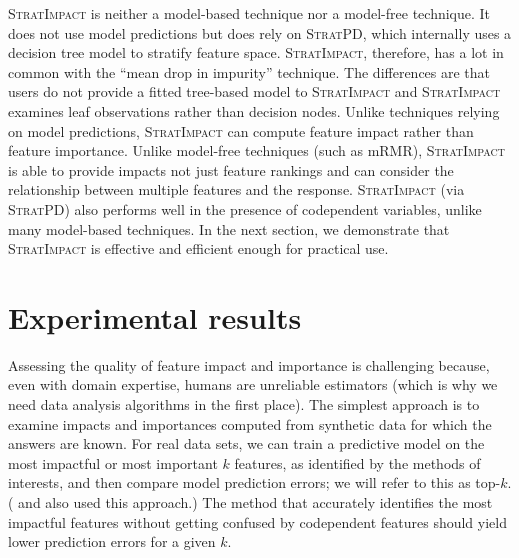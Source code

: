 \documentclass[smallextended]{svjour3}       %
\newcommand{\simp}{\fontfamily{cmr}\textsc{\small StratImpact}}
\newcommand{\spd}{\fontfamily{cmr}\textsc{\small StratPD}}
\begin{document}
\simp{} is neither a model-based technique nor a model-free technique. It does not use model predictions but does rely on \spd, which internally uses a decision tree model to stratify feature space. \simp{}, therefore, has a lot in common with the ``mean drop in impurity'' technique. The  differences are that users do not provide a fitted tree-based model to \simp{} and \simp{} examines leaf observations rather than decision nodes. Unlike techniques relying on model predictions, \simp{} can compute feature impact rather than feature importance. Unlike model-free techniques (such as mRMR), \simp{} is able to provide impacts not just feature rankings and can consider the relationship between multiple features and the response.   \simp{} (via \spd) also performs well in the presence of codependent variables, unlike many model-based techniques. In the next section, we demonstrate that \simp{} is effective and efficient enough for practical use.

\section{Experimental results}\label{sec:experiments}

Assessing the quality of feature impact and importance is challenging because, even with domain expertise, humans are unreliable estimators (which is why we need data analysis algorithms in the first place).  The simplest approach is to examine impacts and importances computed from synthetic data for which the answers are known.  For real data sets, we can train a predictive model on the most impactful or most important $k$ features, as identified by the methods of interests, and then compare model prediction errors; we will refer to this as top-$k$. (\citealt{mRMR} and \citealt{tsanas} also used this approach.) The method that accurately identifies the most impactful features without getting confused by codependent features should yield lower prediction errors for a given $k$.  
\end{document}
